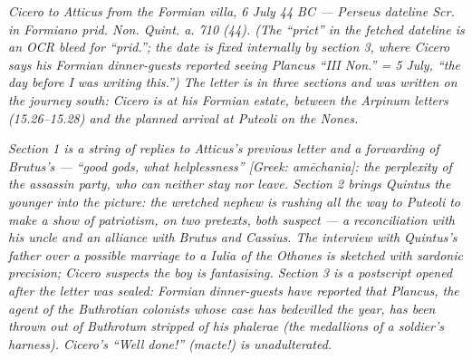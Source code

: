 
\textit{Cicero to Atticus from the Formian villa, 6 July 44 BC
--- Perseus dateline \textit{Scr. in Formiano prid. Non. Quint. a.
710 (44)}. (The ``prict'' in the fetched dateline is an OCR bleed
for ``prid.''; the date is fixed internally by section 3, where
Cicero says his Formian dinner-guests reported seeing Plancus
``III Non.'' = 5 July, ``the day before I was writing this.'') The
letter is in three sections and was written on the journey south:
Cicero is at his Formian estate, between the Arpinum letters
(15.26--15.28) and the planned arrival at Puteoli on the Nones.}

\textit{Section 1 is a string of replies to Atticus's previous
letter and a forwarding of Brutus's --- ``good gods, what
helplessness'' \textit{[Greek: am\=echania]}: the perplexity of
the assassin party, who can neither stay nor leave. Section 2
brings Quintus the younger into the picture: the wretched nephew
is rushing all the way to Puteoli to make a show of patriotism, on
two pretexts, both suspect --- a reconciliation with his uncle and
an alliance with Brutus and Cassius. The interview with Quintus's
father over a possible marriage to a Iulia of the Othones is
sketched with sardonic precision; Cicero suspects the boy is
fantasising. Section 3 is a postscript opened after the letter was
sealed: Formian dinner-guests have reported that Plancus, the
agent of the Buthrotian colonists whose case has bedevilled the
year, has been thrown out of Buthrotum stripped of his
\textit{phalerae} (the medallions of a soldier's harness).
Cicero's ``Well done!'' \textit{(macte!)} is unadulterated.}
